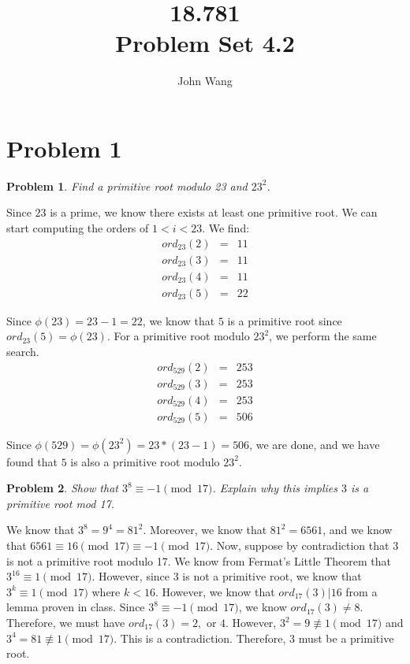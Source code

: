 \documentclass[psamsfonts]{amsart}
\title{18.781 \\
Problem Set 4.2}
\author{John Wang}
\newtheorem{prob}{Problem}[section]
\newenvironment{sol}{{\bfseries Solution}}{\qedsymbol}
\theoremstyle{definition}
\theoremstyle{remark}
\numberwithin{equation}{section}
\begin{document}
\maketitle

\section{Problem 1}

\begin{prob}
Find a primitive root modulo 23 and $23^2$. 
\end{prob}

\begin{sol}
Since $23$ is a prime, we know there exists at least one primitive root. We can start computing the orders of $1 < i < 23$. We find:
\begin{eqnarray}
ord_{23}(2) &=& 11 \\
ord_{23}(3) &=& 11 \\
ord_{23}(4) &=& 11 \\
ord_{23}(5) &=& 22 
\end{eqnarray}

Since $\phi(23) = 23 - 1 = 22$, we know that $5$ is a primitive root since $ord_{23}(5) = \phi(23)$. For a primitive root modulo $23^2$, we perform the same search. 
\begin{eqnarray}
ord_{529}(2) &=& 253 \\
ord_{529}(3) &=& 253 \\
ord_{529}(4) &=& 253 \\
ord_{529}(5) &=& 506
\end{eqnarray}

Since $\phi(529) = \phi(23^2) = 23*(23-1) = 506$, we are done, and we have found that $5$ is also a primitive root modulo $23^2$. 
\end{sol}

\begin{prob}
Show that $3^{8} \equiv -1 \pmod{17}$. Explain why this implies $3$ is a primitive root mod 17. 
\end{prob}

\begin{sol}
We know that $3^8 = 9^4 = 81^2$. Moreover, we know that $81^2 = 6561$, and we know that $6561 \equiv 16 \pmod{17} \equiv -1 \pmod{17}$. Now, suppose by contradiction that $3$ is not a primitive root modulo 17. We know from Fermat's Little Theorem that $3^{16} \equiv 1 \pmod{17}$. However, since $3$ is not a primitive root, we know that $3^{k} \equiv 1 \pmod{17}$ where $k < 16$. However, we know that $ord_{17}(3) | 16$ from a lemma proven in class. Since $3^{8} \equiv -1 \pmod{17}$, we know $ord_{17}(3) \neq 8$. Therefore, we must have $ord_{17}(3) = 2,$ or $4$. However, $3^2 = 9 \not \equiv 1 \pmod{17}$ and $3^4 = 81 \not \equiv 1 \pmod{17}$. This is a contradiction. Therefore, $3$ must be a primitive root.
\end{sol}
\end{document}
